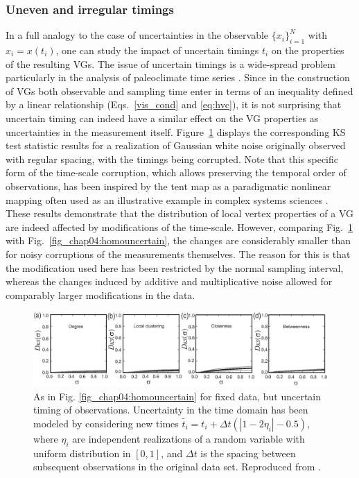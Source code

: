 		\subsubsection{Uneven and irregular timings}
		In a full analogy to the case of uncertainties in the observable $\{x_i \}_{i=1}^N$ with $x_i = x(t_i)$, one can study the impact of uncertain timings $t_i$ on the properties of the resulting VGs. The issue of uncertain timings is a wide-spread problem particularly in the analysis of paleoclimate time series \cite{Telford2004}. Since in the construction of VGs both observable and sampling time enter in terms of an inequality defined by a linear relationship (Eqs.~\ref{vis_cond} and \ref{eq:hvc}), it is not surprising that uncertain timing can indeed have a similar effect on the VG properties as uncertainties in the measurement itself. Figure~\ref{fig_chap04:uncertimings} displays the corresponding KS test statistic results for a realization of Gaussian white noise originally observed with regular spacing, with the timings being corrupted. Note that this specific form of the time-scale corruption, which allows preserving the temporal order of observations, has been inspired by the tent map as a paradigmatic nonlinear mapping often used as an illustrative example in complex systems sciences \cite{Donner2012}. These results demonstrate that the distribution of local vertex properties of a VG are indeed affected by modifications of the time-scale. However, comparing Fig.~\ref{fig_chap04:uncertimings} with Fig.~\ref{fig_chap04:homouncertain}, the changes are considerably smaller than for noisy corruptions of the measurements themselves. The reason for this is that the modification used here has been restricted by the normal sampling interval, whereas the changes induced by additive and multiplicative noise allowed for comparably larger modifications in the data.
		\begin{figure}
		  \centering
		  \includegraphics[width=\columnwidth]{Chapter04_VisibilityGt/fig10N.eps}
		  \caption{As in Fig. \ref{fig_chap04:homouncertain} for fixed data, but uncertain timing of observations. Uncertainty in the time domain has been modeled by considering new times $\tilde{t_i} = t_i + \Delta t (| 1 - 2\eta_i | - 0.5)$, where $\eta_i$ are independent realizations of a random variable with uniform distribution in $[0,1]$, and $\Delta t$ is the spacing between subsequent observations in the original data set.  Reproduced from \cite{Donner2012}. \label{fig_chap04:uncertimings}}
		\end{figure}
				
